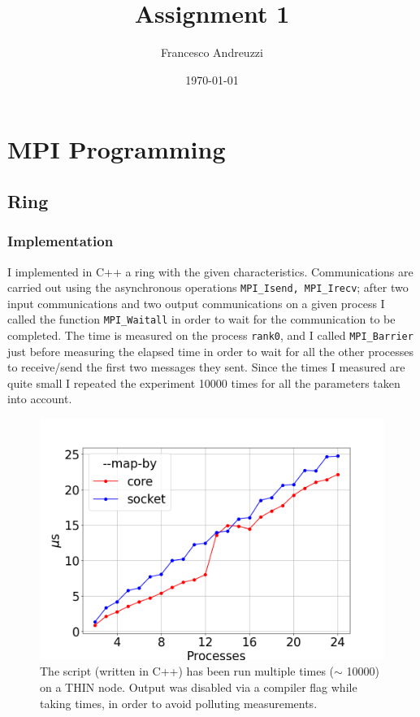 \documentclass{article}
\title{Assignment 1}
\author{Francesco Andreuzzi}
\date{\today}
\begin{document}
\maketitle

\section{MPI Programming}

\subsection{Ring}

\subsubsection{Implementation}
I implemented in C++ a ring with the given characteristics. Communications are carried out using the asynchronous operations \texttt{MPI\_Isend, MPI\_Irecv}; after two input communications and two output communications on a given process I called the function \texttt{MPI\_Waitall} in order to wait for the communication to be completed. The time is measured on the process \texttt{rank0}, and I called \texttt{MPI\_Barrier} just before measuring the elapsed time in order to wait for all the other processes to receive/send the first two messages they sent. Since the times I measured are quite small I repeated the experiment 10000 times for all the parameters taken into account.

\begin{figure}[t]
    \centering
    \includegraphics[width=\textwidth]{ring/fig.png}
    \caption{The script (written in C++) has been run multiple times ($\sim$ 10000) on a THIN node. Output was disabled via a compiler flag while taking times, in order to avoid polluting measurements.}
    \label{fig:ring_performance}
\end{figure}
\end{document}
